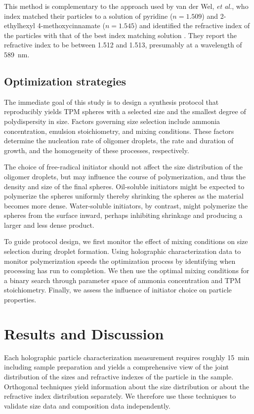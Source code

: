 \documentclass[journal=langd5,manuscript=article]{achemso}
\begin{document}
This method is complementary to the approach used
by van der Wel, \emph{et al.},
who index matched their particles to a solution of
pyridine ($n=1.509$) and \num{2}-ethylhexyl
\num{4}-methoxycinnamate ($n = \num{1.545}$)
and identified the refractive index of the particles
with that of the best index matching solution \cite{vanderwel17}.
They report the refractive index to be between 
\num{1.512} and \num{1.513},
presumably at a wavelength of \SI{589}{\nm}.

\subsection{Optimization strategies}
\label{sec:optimizationstrategies}

The immediate goal of this study is to design
a synthesis protocol that reproducibly 
yields TPM spheres with a selected size and
the smallest degree of polydispersity in size.
Factors governing size selection include
ammonia concentration, emulsion stoichiometry,
and mixing conditions.
These factors determine the nucleation rate of oligomer
droplets, the rate and duration of growth, 
and the homogeneity of these processes, respectively.

The choice of free-radical initiator should not affect
the size distribution of the oligomer droplets, but
may influence the course of polymerization, and thus
the density and size of the final spheres.
Oil-soluble initiators might be expected to
polymerize the spheres uniformly thereby
shrinking the spheres as the material becomes more
dense.
Water-soluble initiators, by contrast, might
polymerize the spheres from the surface inward,
perhaps inhibiting shrinkage and producing a 
larger and less dense product.

To guide protocol design, we first monitor
the effect of mixing conditions on size selection
during droplet formation.
Using holographic characterization data to 
monitor polymerization speeds the optimization process
by identifying when processing has run to completion.
We then use the optimal mixing conditions for
a binary search through parameter space of
ammonia concentration and TPM stoichiometry.
Finally, we assess the influence of initiator
choice on particle properties.

\section{Results and Discussion}
\label{sec:results}

Each holographic particle characterization
measurement
requires roughly \SI{15}{\minute} including
sample preparation and yields 
a comprehensive view of the joint
distribution of the sizes and refractive
indexes of the particle in the sample.
Orthogonal techniques yield information
about the size distribution or about
the refractive index distribution separately.
We therefore use these techniques to validate
size data and composition data independently.
\end{document}
